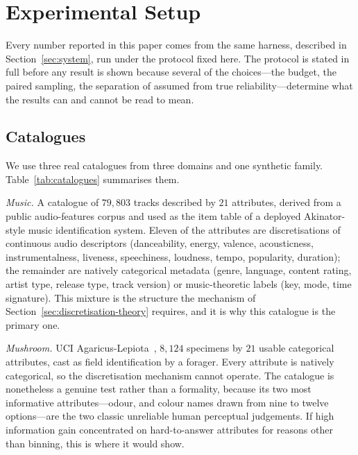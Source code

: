 \section{Experimental Setup}
\label{sec:setup}

Every number reported in this paper comes from the same harness, described in
Section~\ref{sec:system}, run under the protocol fixed here. The protocol is
stated in full before any result is shown because several of the choices---the
budget, the paired sampling, the separation of assumed from true
reliability---determine what the results can and cannot be read to mean.

\subsection{Catalogues}
\label{sec:catalogues}

We use three real catalogues from three domains and one synthetic family.
Table~\ref{tab:catalogues} summarises them.

\emph{Music.} A catalogue of $79{,}803$ tracks described by $21$ attributes,
derived from a public audio-features corpus and used as the item table of a
deployed Akinator-style music identification system. Eleven of the attributes
are discretisations of continuous audio descriptors (danceability, energy,
valence, acousticness, instrumentalness, liveness, speechiness, loudness,
tempo, popularity, duration); the remainder are natively categorical metadata
(genre, language, content rating, artist type, release type, track version) or
music-theoretic labels (key, mode, time signature). This mixture is the
structure the mechanism of Section~\ref{sec:discretisation-theory} requires,
and it is why this catalogue is the primary one.

\emph{Mushroom.} UCI Agaricus-Lepiota~\cite{uci}, $8{,}124$ specimens by $21$ usable
categorical attributes, cast as field identification by a forager. Every
attribute is natively categorical, so the discretisation mechanism cannot
operate. The catalogue is nonetheless a genuine test rather than a formality,
because its two most informative attributes---odour, and colour names drawn
from nine to twelve options---are the two classic unreliable human perceptual
judgements. If high information gain concentrated on hard-to-answer attributes
for reasons other than binning, this is where it would show.

